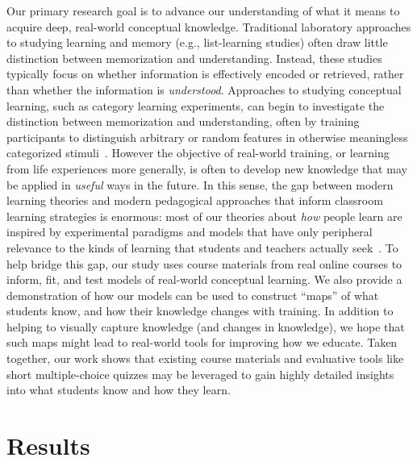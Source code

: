 \documentclass[10pt]{article}
\begin{document}
Our primary research goal is to advance our understanding of what it means to
acquire deep, real-world conceptual knowledge. Traditional laboratory
approaches to studying learning and memory (e.g., list-learning studies) often
draw little distinction between memorization and understanding. Instead, these
studies typically focus on whether information is effectively encoded or
retrieved, rather than whether the information is \textit{understood}.
Approaches to studying conceptual learning, such as category learning
experiments, can begin to investigate the distinction between memorization and
understanding, often by training participants to distinguish arbitrary or
random features in otherwise meaningless categorized stimuli~\citep{ReilEtal82,
Este86a, Este86b, GlucEtal02, AshbMadd05, HulbNorm15}. However the objective of
real-world training, or learning from life experiences more generally, is often
to develop new knowledge that may be applied in \textit{useful} ways in the
future. In this sense, the gap between modern learning theories and modern
pedagogical approaches that inform classroom learning strategies is enormous:
most of our theories about \textit{how} people learn are inspired by
experimental paradigms and models that have only peripheral relevance to the
kinds of learning that students and teachers actually seek~\citep{Macl05,
HallGree08}. To help bridge this gap, our study uses course materials from real
online courses to inform, fit, and test models of real-world conceptual
learning. We also provide a demonstration of how our models can be used to
construct ``maps'' of what students know, and how their knowledge changes with
training. In addition to helping to visually capture knowledge (and changes in
knowledge), we hope that such maps might lead to real-world tools for improving
how we educate. Taken together, our work shows that existing course materials
and evaluative tools like short multiple-choice quizzes may be leveraged to
gain highly detailed insights into what students know and how they learn.

\section*{Results}
\end{document}
